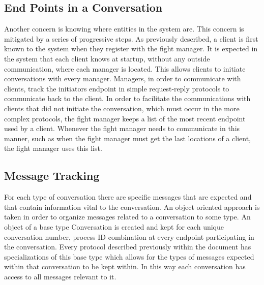 \documentclass[12pt]{article}
\begin{document}
	\subsection{End Points in a Conversation}
		Another concern is knowing where entities in the system are. This concern is mitigated by a series of progressive steps. As previously described, a client is first known to the system when they register with the fight manager. It is expected in the system that each client knows at startup, without any outside communication, where each manager is located. This allows clients to initiate conversations with every manager. 
		Managers, in order to communicate with clients, track the initiators endpoint in simple request-reply protocols to communicate back to the client. In order to facilitate the communications with clients that did not initiate the conversation, which must occur in the more complex protocols, the fight manager keeps a list of the most recent endpoint used by a client. Whenever the fight manager needs to communicate in this manner, such as when the fight manager must get the last locations of a client, the fight manager uses this list.
	\subsection{Message Tracking}
		For each type of conversation there are specific messages that are expected and that contain information vital to the conversation. An object oriented approach is taken in order to organize messages related to a conversation to some type. An object of a base type Conversation is created and kept for each unique conversation number, process ID combination at every endpoint participating in the conversation. Every protocol described previously within the document has specializations of this base type which allows for the types of messages expected within that conversation to be kept within. In this way each conversation has access to all messages relevant to it.
\end{document}
